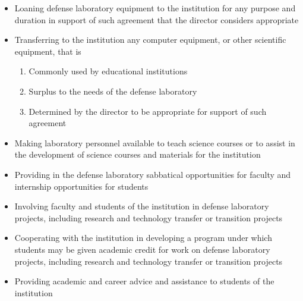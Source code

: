 \documentclass[../../../main.tex]{subfiles}
\begin{document}
\begin{itemize}
\item Loaning defense laboratory equipment to the institution for any purpose and duration in support of such agreement that the director considers appropriate
\item Transferring to the institution any computer equipment, or other scientific equipment, that is
\begin{enumerate}
\item Commonly used by educational institutions
\item Surplus to the needs of the defense laboratory
\item Determined by the director to be appropriate for support of such agreement
\end{enumerate}
\item Making laboratory personnel available to teach science courses or to assist in the development of science courses and materials for the institution
\item Providing in the defense laboratory sabbatical opportunities for faculty and internship opportunities for students
\item Involving faculty and students of the institution in defense laboratory projects, including research and technology transfer or transition projects
\item Cooperating with the institution in developing a program under which students may be given academic credit for work on defense laboratory projects, including research and technology transfer or transition projects
\item Providing academic and career advice and assistance to students of the institution
\end{itemize}
\end{document}

